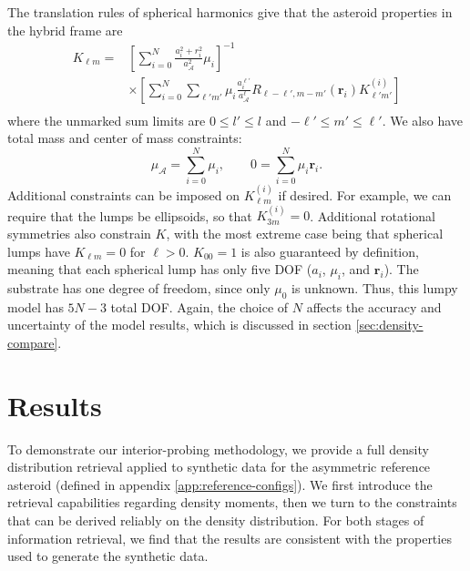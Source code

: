 \documentclass[fleqn,usenatbib]{mnras}
\newcommand{\brackets}[1]{\left[ #1 \right]}
\begin{document}
The translation rules of spherical harmonics \cite{Gelderen1998TheSO} give that the asteroid properties in the hybrid frame are
\begin{equation}
  \begin{aligned}
    K_{\ell m} = &\brackets{\sum_{i=0}^N \frac{a_i^2 + r_i^2}
    {a_\mathcal{A}^2}\mu_i}^{-1} \\
    &\times \brackets{\sum_{i=0}^N \sum_{\ell' m'}\mu_i
    \frac{a_i^{\ell'}}{a_\mathcal{A}^\ell}
    R_{\ell - \ell', m - m'}(\bm r_i)K_{\ell' m'}^{(i)}} \\
  \end{aligned}
\end{equation}
where the unmarked sum limits are $0 \leq l' \leq l$ and $-\ell' \leq m' \leq \ell'$. We also have total mass and center of mass constraints:
\begin{equation}
  \mu_\mathcal{A} = \sum_{i=0}^N \mu_i,  \qquad 0 = \sum_{i=0}^N \mu_i \bm r_i.
\end{equation}
Additional constraints can be imposed on $K_{\ell m}^{(i)}$ if desired. For example, we can require that the lumps be ellipsoids, so that $K_{3 m}^{(i)} = 0$. Additional rotational symmetries also constrain $K$, with the most extreme case being that spherical lumps have $K_{\ell m} = 0$ for $\ell > 0$. $K_{00}=1$ is also guaranteed by definition, meaning that each spherical lump has only five DOF ($a_i$, $\mu_i$, and $\bm r_i$). The substrate has one degree of freedom, since only $\mu_0$ is unknown. Thus, this lumpy model has $5N - 3$ total DOF. Again, the choice of $N$ affects the accuracy and uncertainty of the model results, which is discussed in section \ref{sec:density-compare}.



\section{Results}
\label{sec:results}

To demonstrate our interior-probing methodology, we provide a full density distribution retrieval applied to synthetic data for the asymmetric reference asteroid (defined in appendix \ref{app:reference-configs}). We first introduce the retrieval capabilities regarding density moments, then we turn to the constraints that can be derived reliably on the density distribution. For both stages of information retrieval, we find that the results are consistent with the properties used to generate the synthetic data.
\end{document}
